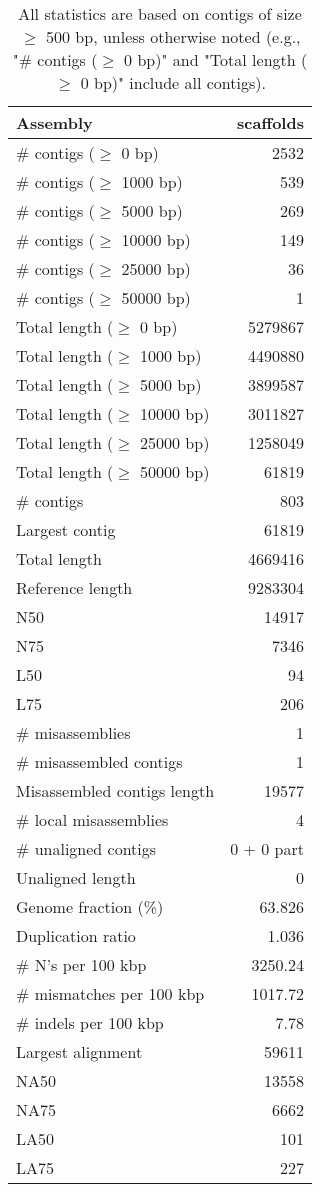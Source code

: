 \documentclass[12pt,a4paper]{article}
\begin{document}
\begin{table}[ht]
\begin{center}
\caption{All statistics are based on contigs of size $\geq$ 500 bp, unless otherwise noted (e.g., "\# contigs ($\geq$ 0 bp)" and "Total length ($\geq$ 0 bp)" include all contigs).}
\begin{tabular}{|l*{1}{|r}|}
\hline
Assembly & scaffolds \\ \hline
\# contigs ($\geq$ 0 bp) & 2532 \\ \hline
\# contigs ($\geq$ 1000 bp) & 539 \\ \hline
\# contigs ($\geq$ 5000 bp) & 269 \\ \hline
\# contigs ($\geq$ 10000 bp) & 149 \\ \hline
\# contigs ($\geq$ 25000 bp) & 36 \\ \hline
\# contigs ($\geq$ 50000 bp) & 1 \\ \hline
Total length ($\geq$ 0 bp) & 5279867 \\ \hline
Total length ($\geq$ 1000 bp) & 4490880 \\ \hline
Total length ($\geq$ 5000 bp) & 3899587 \\ \hline
Total length ($\geq$ 10000 bp) & 3011827 \\ \hline
Total length ($\geq$ 25000 bp) & 1258049 \\ \hline
Total length ($\geq$ 50000 bp) & 61819 \\ \hline
\# contigs & 803 \\ \hline
Largest contig & 61819 \\ \hline
Total length & 4669416 \\ \hline
Reference length & 9283304 \\ \hline
N50 & 14917 \\ \hline
N75 & 7346 \\ \hline
L50 & 94 \\ \hline
L75 & 206 \\ \hline
\# misassemblies & 1 \\ \hline
\# misassembled contigs & 1 \\ \hline
Misassembled contigs length & 19577 \\ \hline
\# local misassemblies & 4 \\ \hline
\# unaligned contigs & 0 + 0 part \\ \hline
Unaligned length & 0 \\ \hline
Genome fraction (\%) & 63.826 \\ \hline
Duplication ratio & 1.036 \\ \hline
\# N's per 100 kbp & 3250.24 \\ \hline
\# mismatches per 100 kbp & 1017.72 \\ \hline
\# indels per 100 kbp & 7.78 \\ \hline
Largest alignment & 59611 \\ \hline
NA50 & 13558 \\ \hline
NA75 & 6662 \\ \hline
LA50 & 101 \\ \hline
LA75 & 227 \\ \hline
\end{tabular}
\end{center}
\end{table}
\end{document}
